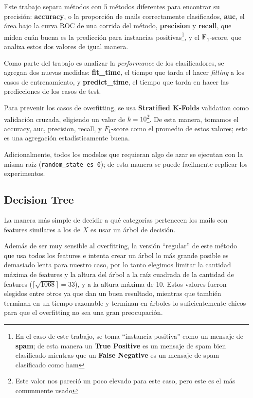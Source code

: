 \documentclass{article}
\newcommand{\fo}{\(\mathbf{F_1}\)}
\begin{document}
Este trabajo separa métodos con 5 métodos diferentes para encontrar su precisión: \textbf{accuracy}, o la proporción de mails correctamente clasificados, \textbf{auc}, el área bajo la curva ROC de una corrida del método, \textbf{precision} y \textbf{recall}, que miden cuán buena es la predicción para instancias positivas\footnote{En el caso de este trabajo, se toma ``instancia positiva'' como un mensaje de \textbf{spam}; de esta manera un \textbf{True Positive} es un mensaje de spam bien clasificado mientras que un \textbf{False Negative} es un mensaje de spam clasificado como ham}, y el \fo-score, que analiza estos dos valores de igual manera.

Como parte del trabajo es analizar la \textit{performance} de los clasificadores, se agregan dos nuevas medidas: \textbf{fit\_time}, el tiempo que tarda el hacer \textit{fitting} a los casos de entrenamiento, y \textbf{predict\_time}, el tiempo que tarda en hacer las predicciones de los casos de test.

Para prevenir los casos de overfitting, se usa \textbf{Stratified K-Folds} validation como validación cruzada, eligiendo un valor de \( k = 10 \)\footnote{Este valor nos pareció un poco elevado para este caso, pero este es el más comunmente usado}. De esta manera, tomamos el accuracy, auc, precision, recall, y \(F_1\)-score como el promedio de estos valores; esto es una agregación estadísticamente buena\cite{forman2010}.

Adicionalmente, todos los modelos que requieran algo de azar se ejecutan con la misma raíz (\texttt{random\_state es 0}); de esta manera se puede facilmente replicar los experimentos.

\subsection{Decision Tree}

La manera más simple de decidir a qué categorías pertenecen los mails con features similares a los de \( X \) es usar un árbol de decisión.

Además de ser muy sensible al overfitting, la versión ``regular'' de este método que usa todos los features e intenta crear un árbol lo más grande posible es demasiado lenta para nuestro caso, por lo tanto elegimos limitar la cantidad máxima de features y la altura del árbol a la raíz cuadrada de la cantidad de features (\(\lceil\sqrt{1068}\rceil = 33\)), y a la altura máxima de 10. Estos valores fueron elegidos entre otros ya que dan un buen resultado, mientras que también terminan en un tiempo razonable y terminan en árboles lo suficientemente chicos para que el overfitting no sea una gran preocupación.
\end{document}
